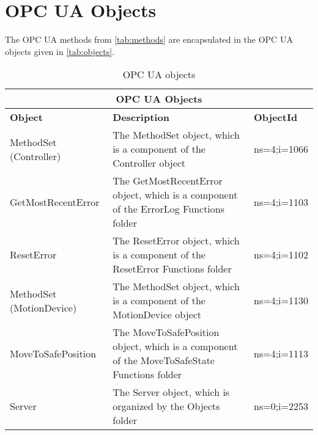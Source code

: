 \documentclass{article}
\begin{document}
\section{OPC UA Objects}
The OPC UA methods from \autoref{tab:methods} are encapsulated in the OPC UA objects given in \autoref{tab:objects}.
\begin{table}[H]
	\setlength\extrarowheight{4pt}
	\small
	\begin{tabularx}{\textwidth}{|p{4cm}|X|p{2cm}|}
		\hline
		\multicolumn{3}{|c|}{\bf \color{black} \large OPC UA Objects}\\
		\hline\hline
		\bf Object &\bf Description & \bf ObjectId \\
		\hline\hline
		MethodSet (Controller) & The MethodSet object, which is a component of the Controller object & ns=4;i=1066 \\ \hline
		GetMostRecentError & The GetMostRecentError object, which is a component of the ErrorLog Functions folder & ns=4;i=1103 \\ \hline
		ResetError & The ResetError object, which is a component of the ResetError Functions folder & ns=4;i=1102 \\ \hline
		MethodSet (MotionDevice) & The MethodSet object, which is a component of the MotionDevice object & ns=4;i=1130 \\ \hline
		MoveToSafePosition & The MoveToSafePosition object, which is a component of the MoveToSafeState Functions folder & ns=4;i=1113 \\ \hline
		Server & The Server object, which is organized by the Objects folder & ns=0;i=2253 \\ \hline
	\end{tabularx}
	\caption{OPC UA objects}
	\label{tab:objects}
\end{table}
\end{document}
